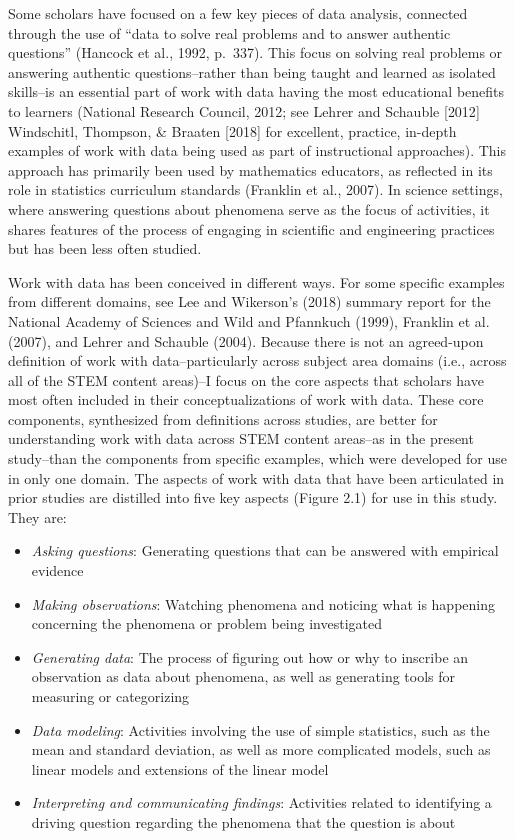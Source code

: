 \documentclass[]{msu-thesis}
\providecommand{\tightlist}{%
  \setlength{\itemsep}{0pt}\setlength{\parskip}{0pt}}
\theoremstyle{definition}
\theoremstyle{definition}
\theoremstyle{definition}
\theoremstyle{remark}
\begin{document}
Some scholars have focused on a few key pieces of data analysis,
connected through the use of ``data to solve real problems and to answer
authentic questions'' (Hancock et al., 1992, p.~337). This focus on
solving real problems or answering authentic questions--rather than
being taught and learned as isolated skills--is an essential part of
work with data having the most educational benefits to learners
(National Research Council, 2012; see Lehrer and Schauble {[}2012{]}
Windschitl, Thompson, \& Braaten {[}2018{]} for excellent, practice,
in-depth examples of work with data being used as part of instructional
approaches). This approach has primarily been used by mathematics
educators, as reflected in its role in statistics curriculum standards
(Franklin et al., 2007). In science settings, where answering questions
about phenomena serve as the focus of activities, it shares features of
the process of engaging in scientific and engineering practices but has
been less often studied.

Work with data has been conceived in different ways. For some specific
examples from different domains, see Lee and Wikerson's (2018) summary
report for the National Academy of Sciences and Wild and Pfannkuch
(1999), Franklin et al. (2007), and Lehrer and Schauble (2004). Because
there is not an agreed-upon definition of work with data--particularly
across subject area domains (i.e., across all of the STEM content
areas)--I focus on the core aspects that scholars have most often
included in their conceptualizations of work with data. These core
components, synthesized from definitions across studies, are better for
understanding work with data across STEM content areas--as in the
present study--than the components from specific examples, which were
developed for use in only one domain. The aspects of work with data that
have been articulated in prior studies are distilled into five key
aspects (Figure 2.1) for use in this study. They are:

\begin{itemize}
\tightlist
\item
  \emph{Asking questions}: Generating questions that can be answered
  with empirical evidence
\item
  \emph{Making observations}: Watching phenomena and noticing what is
  happening concerning the phenomena or problem being investigated
\item
  \emph{Generating data}: The process of figuring out how or why to
  inscribe an observation as data about phenomena, as well as generating
  tools for measuring or categorizing
\item
  \emph{Data modeling}: Activities involving the use of simple
  statistics, such as the mean and standard deviation, as well as more
  complicated models, such as linear models and extensions of the linear
  model
\item
  \emph{Interpreting and communicating findings}: Activities related to
  identifying a driving question regarding the phenomena that the
  question is about
\end{itemize}
\end{document}
